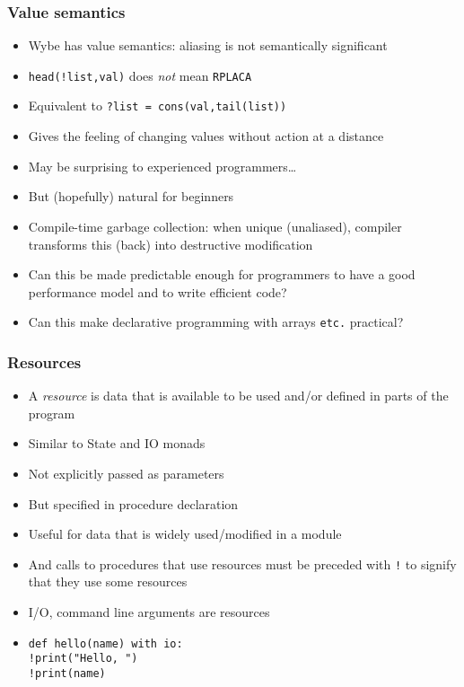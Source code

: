 \documentclass[12pt]{beamer}
\begin{document}
\begin{frame}
\frametitle{Value semantics}
\begin{itemize}
\item Wybe has value semantics:  aliasing is not semantically significant
\item \texttt{head(!list,val)} does \emph{not} mean \texttt{RPLACA}
\item Equivalent to \texttt{?list = cons(val,tail(list))}
\item Gives the feeling of changing values without action at a distance
\item May be surprising to experienced programmers\ldots
\item But (hopefully) natural for beginners
\item Compile-time garbage collection:  when unique (unaliased),
  compiler transforms this (back) into destructive modification
\item Can this be made predictable enough for programmers
  to have a good performance model and to write efficient code?
\item Can this make declarative programming with arrays \texttt{etc.} practical?
\end{itemize}
\end{frame}


\begin{frame}
\frametitle{Resources}
\begin{itemize}
\item A \emph{resource} is data that is available to be used and/or
  defined in parts of the program
\item Similar to State and IO monads
\item Not explicitly passed as parameters
\item But specified in procedure declaration
\item Useful for data that is widely used/modified in a module
\item And calls to procedures that use resources must be preceded with
  \texttt{!} to signify that they use some resources
\item I/O, command line arguments are resources
\item \texttt{def hello(name) with io:} \\
\hspace*{2em}\texttt{!print("Hello, ")} \\
\hspace*{2em}\texttt{!print(name)} \\
\end{itemize}
\end{frame}
\end{document}
